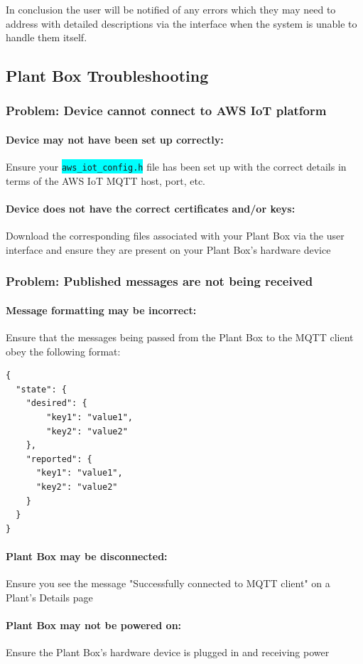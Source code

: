 \documentclass{article}
\begin{document}
	In conclusion the user will be notified of any errors which they may need to address with detailed descriptions via the interface when the system is unable to handle them itself.
	
\cleardoublepage	
	
	\subsection{Plant Box Troubleshooting}
		\subsubsection{Problem: Device cannot connect to AWS IoT platform}
			\paragraph{Device may not have been set up correctly:} 
				Ensure your \colorbox{cyan}{\lstinline[basicstyle=\ttfamily\color{white}]|aws_iot_config.h|} file has been set up with the correct details in terms of the AWS IoT MQTT host, port, etc.
			\paragraph{Device does not have the correct certificates and/or keys:}
				Download the corresponding files associated with your Plant Box via the user interface and ensure they are present on your Plant Box's hardware device
				
		\subsubsection{Problem: Published messages are not being received}
			\paragraph{Message formatting may be incorrect:}
				Ensure that the messages being passed from the Plant Box to the MQTT client obey the following format:
\begin{lstlisting}
{
  "state": {
    "desired": {
    	"key1": "value1",
    	"key2": "value2"
    },
    "reported": {
      "key1": "value1",
      "key2": "value2"
    }
  }
}
\end{lstlisting}
			\paragraph{Plant Box may be disconnected:} Ensure you see the message "Successfully connected to MQTT client" on a Plant's Details page
			\paragraph{Plant Box may not be powered on:} Ensure the Plant Box's hardware device is plugged in and receiving power
\end{document}
